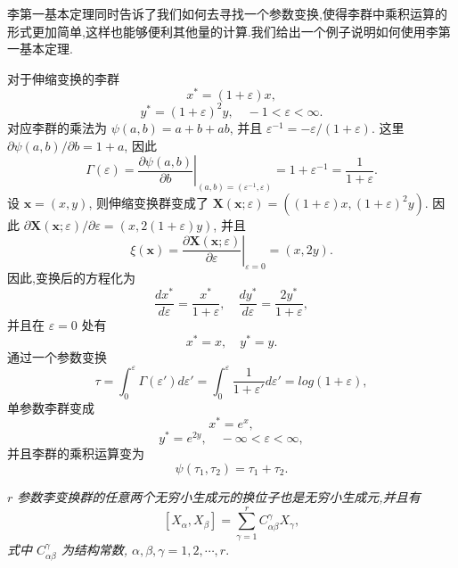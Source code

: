 李第一基本定理同时告诉了我们如何去寻找一个参数变换,使得李群中乘积运算的形式更加简单,这样也能够便利其他量的计算.我们给出一个例子说明如何使用李第一基本定理.

对于伸缩变换的李群
\begin{equation*}
	x^*=(1+\varepsilon)x,
\end{equation*}
\begin{equation*}
	y^*=(1+\varepsilon)^2y,\quad -1<\varepsilon<\infty.
\end{equation*}
对应李群的乘法为 $\psi(a,b)=a+b+ab$, 并且 $\varepsilon^{-1}=-\varepsilon/(1+\varepsilon)$. 这里 $\partial \psi(a,b)/\partial b=1+a$, 因此
\begin{equation*}
	\Gamma(\varepsilon) = \left.\frac{\partial \psi(a,b)}{\partial b}\right|_{(a,b)=(\varepsilon^{-1},\varepsilon)}=1+\varepsilon^{-1}=\frac{1}{1+\varepsilon}.
\end{equation*}
设 $\mathbf{x}=(x,y)$, 则伸缩变换群变成了 $\mathbf{X}(\mathbf{x};\varepsilon)=((1+\varepsilon)x,(1+\varepsilon)^2y)$. 因此 $\partial \mathbf{X}(\mathbf{x};\varepsilon)/\partial \varepsilon=(x,2(1+\varepsilon)y)$, 并且
\begin{equation*}
	\xi(\mathbf{x})=\left.\frac{\partial \mathbf{X}(\mathbf{x};\varepsilon)}{\partial \varepsilon}\right|_{\varepsilon=0}=(x,2y).
\end{equation*}
因此,变换后的方程化为
\begin{equation*}
	\frac{dx^*}{d\varepsilon}=\frac{x^*}{1+\varepsilon},\quad \frac{dy^*}{d\varepsilon}=\frac{2y^*}{1+\varepsilon},
\end{equation*}
并且在 $\varepsilon=0$ 处有
\begin{equation*}
	x^*=x,\quad y^*=y.
\end{equation*}
通过一个参数变换
\begin{equation*}
	\tau=\int_{0}^{\varepsilon}\Gamma(\varepsilon ')d\varepsilon '=\int_{0}^{\varepsilon}\frac{1}{1+\varepsilon '}d\varepsilon ' = log(1+\varepsilon),
\end{equation*}
单参数李群变成
\begin{equation*}
	x^*=e^x,
\end{equation*}
\begin{equation*}
	y^*=e^{2y},\quad -\infty<\varepsilon<\infty,
\end{equation*}
并且李群的乘积运算变为
\begin{equation*}
	\psi(\tau_1,\tau_2)=\tau_1+\tau_2.
\end{equation*}

\begin{theorem}[李第二基本定理]
\emph{$r$ 参数李变换群的任意两个无穷小生成元的换位子也是无穷小生成元,并且有
\begin{equation}\label{eq:liec}
[X_\alpha,X_\beta] =\sum_{\gamma=1}^{r}C_{\alpha\beta}^{\gamma}X_{\gamma},
\end{equation}
式中 $C_{\alpha\beta}^{\gamma}$ 为结构常数, $\alpha,\beta,\gamma=1,2,\cdots,r.$}
\end{theorem}

